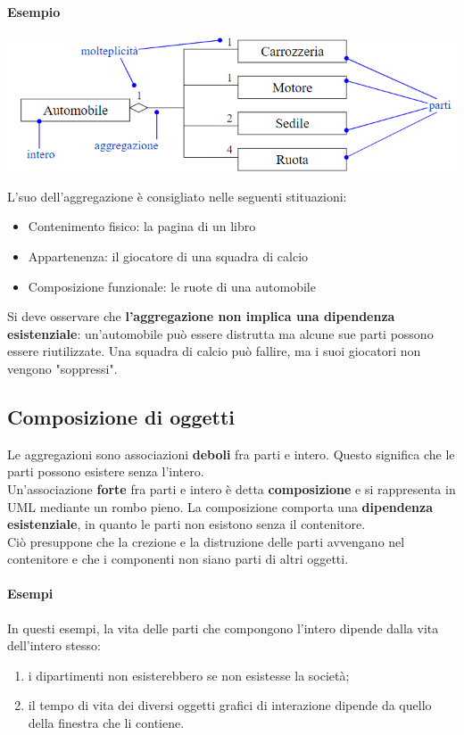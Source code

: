 \documentclass{article}
\begin{document}
	\paragraph*{Esempio}
	\begin{center}
		\includegraphics[scale=0.5]{assets/aggregazione_notazione.png}
	\end{center}
	L'suo dell'aggregazione è consigliato nelle seguenti stituazioni:
	\begin{itemize}
		\item Contenimento fisico: la pagina di un libro
		\item Appartenenza: il giocatore di una squadra di calcio
		\item Composizione funzionale: le ruote di una automobile
	\end{itemize}
	Si deve osservare che \textbf{l'aggregazione non implica una dipendenza esistenziale}: un'automobile può essere distrutta ma alcune sue parti possono essere riutilizzate. Una squadra di calcio può fallire, ma i suoi giocatori non vengono "soppressi".

	\subsection{Composizione di oggetti}
	Le aggregazioni sono associazioni \textbf{deboli} fra parti e intero. Questo significa che le parti possono esistere senza l'intero.
	\vspace{\baselineskip} \\
	Un'associazione \textbf{forte} fra parti e intero è detta \textbf{composizione} e si rappresenta in UML mediante un rombo pieno. La composizione comporta una \textbf{dipendenza esistenziale}, in quanto le parti non esistono senza il contenitore. \\
	Ciò presuppone che la crezione e la distruzione delle parti avvengano nel contenitore e che i componenti non siano parti di altri oggetti.
	\paragraph*{Esempi}
	In questi esempi, la vita delle parti che compongono l'intero dipende dalla vita dell'intero stesso:
	\begin{enumerate}
		\item i dipartimenti non esisterebbero se non esistesse la società;
		\item il tempo di vita dei diversi oggetti grafici di interazione dipende da quello della finestra che li contiene.
	\end{enumerate}
\end{document}
